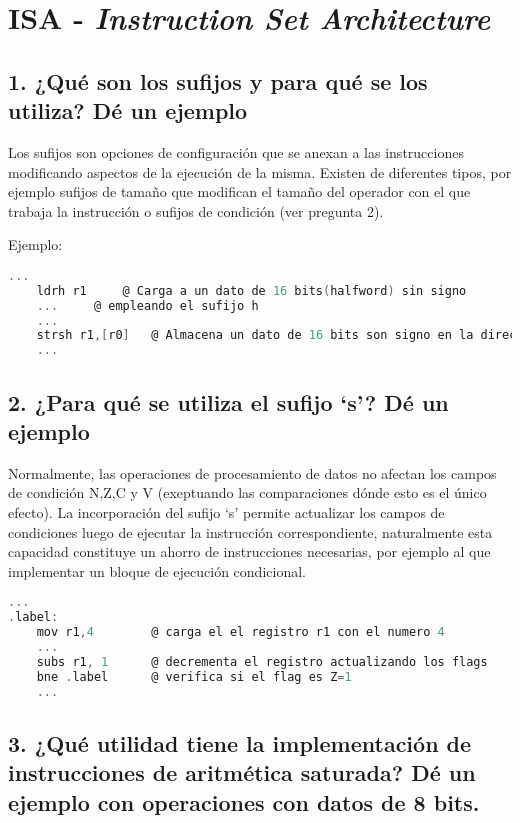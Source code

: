 \documentclass[10pt,a4paper,twoside,spanish]{article}	%
\begin{document}
 
\section*{ISA - \textit{Instruction Set Architecture}}

\subsection*{1. ¿Qué son los sufijos y para qué se los utiliza? Dé un ejemplo}

Los sufijos son opciones de configuración que se anexan a las instrucciones modificando aspectos de la ejecución de la misma. Existen de diferentes tipos, por ejemplo sufijos de tamaño que modifican el tamaño del operador con el que trabaja la instrucción o sufijos de condición (ver pregunta 2).

Ejemplo:
\begin{lstlisting}[language=C]
	...
	ldrh r1		@ Carga a un dato de 16 bits(halfword) sin signo 
	...		@ empleando el sufijo h 
	...
	strsh r1,[r0]	@ Almacena un dato de 16 bits son signo en la direccion r0	
	...
\end{lstlisting}




\subsection*{2. ¿Para qué se utiliza el sufijo ‘s’? Dé un ejemplo}

Normalmente, las operaciones de procesamiento de datos no afectan los campos de condición N,Z,C y V  (exeptuando las comparaciones dónde esto es el único efecto). La incorporación del sufijo ‘s’ permite actualizar los campos de condiciones luego de ejecutar la instrucción correspondiente, naturalmente esta capacidad constituye un ahorro de instrucciones necesarias, por ejemplo al que implementar un bloque de ejecución condicional.

\begin{lstlisting}[language=C]
	...
.label:
	mov r1,4		@ carga el el registro r1 con el numero 4 
	...	
	subs r1, 1		@ decrementa el registro actualizando los flags			
	bne .label		@ verifica si el flag es Z=1
	...
\end{lstlisting}


\subsection*{3. ¿Qué utilidad tiene la implementación de instrucciones de aritmética saturada? Dé un ejemplo con operaciones con datos de 8 bits.}
\end{document}
